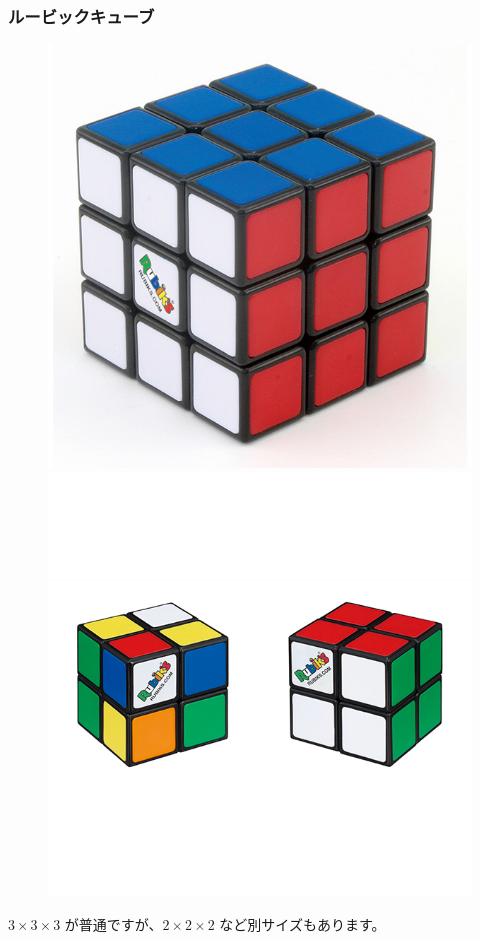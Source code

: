 \documentclass{beamer}
\begin{document}
\begin{frame}
    \frametitle{ルービックキューブ}

    \begin{figure}
        \includegraphics[scale=0.25]{images/rubik3.jpg}
        \includegraphics[scale=0.25]{images/rubik2.jpg}
    \end{figure}

    \(3 \times 3 \times 3\) が普通ですが、\(2 \times 2 \times 2\) など別サイズもあります。
\end{frame}
\end{document}
